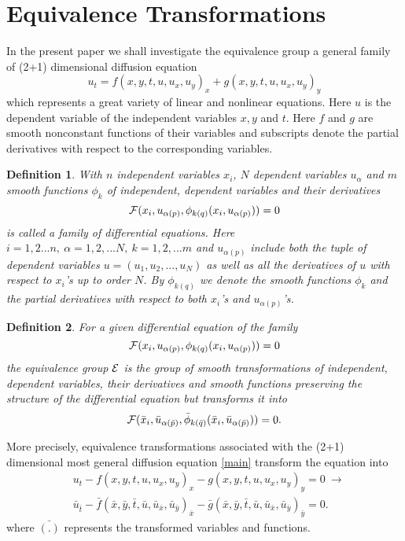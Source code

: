\documentclass[a4paper]{article}
\newtheorem{definition}{Definition}
\def\be{\begin{equation}}
\def\ee{\end{equation}}
\begin{document}
\section{Equivalence Transformations}
In the present paper we shall investigate the equivalence group a general family of (2+1) dimensional diffusion equation
\be
\label{main}
u_t=f(x,y,t,u,u_x,u_y)_x +g(x,y,t,u,u_x,u_y)_y
\ee
 which represents a great variety  of linear and nonlinear equations. Here $u$ is the dependent variable of the independent variables $x,y$ and $t$. Here $f$ and $g$
are smooth nonconstant functions of their variables and subscripts
denote the partial derivatives with respect to the corresponding variables.
\begin{definition}
With $n$ independent variables $x_i$, $N$ dependent variables $u_\alpha$ and $m$ smooth functions $\phi_k$ of independent, dependent variables and their derivatives
$$
{\cal F}(x_i,u_{\alpha(p)},\phi_{k(q)}(x_i,u_{\alpha (p)}))=0
$$
is called  a family of differential equations. Here
 $ i=1,2...n,\ \alpha=1,2,...N,\ k=1,2,...m$ and $u_{\alpha (p)}$ include both the tuple of dependent variables $u=(u_1,u_2,...,u_N)$ as well as all the derivatives of $u$ with respect to $x_i$'s up to order $N$. By $\phi_{k(q)}$ we denote the smooth functions $\phi_k$ and  the partial derivatives with respect to both $x_i$'s and $u_{\alpha (p)}$'s.
\end{definition}
 \begin{definition}
For a given differential equation of the family
$$
{\cal F}(x_i,u_{\alpha(p)},\phi_{k(q)}(x_i,u_{\alpha (p)}))=0
$$
the equivalence group $\cal{E}$  is the group of smooth transformations of independent, dependent variables, their derivatives  and smooth functions preserving the structure of the differential equation but transforms it into
$${\cal F}(\bar x_i,\bar u_{\alpha(\bar p)},\bar\phi_{k(\bar q)}(\bar x_i,\bar u_{\alpha (\bar p)}))=0. $$
 \end{definition}
 More precisely, equivalence transformations associated with the (2+1) dimensional most general
diffusion equation \eqref{main} transform the equation into
\begin{align*}
& u_t-f(x,y,t,u,u_x,u_y)_x -g(x,y,t,u,u_x,u_y)_y=0\ \longrightarrow \\
& \bar
u_{\bar t}-\bar f(\bar x,\bar y,\bar t,\bar u,\bar u_{\bar x},\bar
u_{\bar y})_{\bar x} -\bar g(\bar x,\bar y,\bar t,\bar u,\bar
u_{\bar x},\bar u_{\bar y})_{\bar y}=0.
\end{align*}
where $\bar {(.)}$ represents the transformed variables and functions.\par
\end{document}
